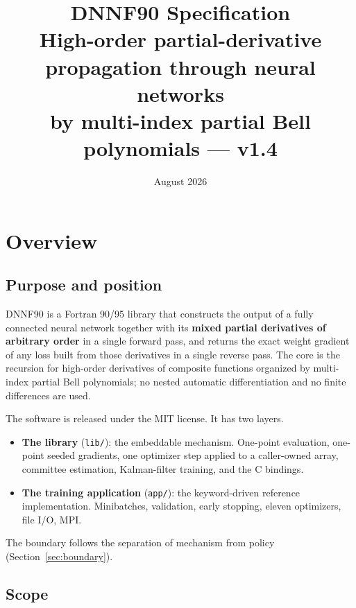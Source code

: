\documentclass[10pt,a4paper]{article}
\title{DNNF90 Specification\\[1mm]
{\large High-order partial-derivative propagation through neural networks\\
by multi-index partial Bell polynomials --- v1.4}}
\date{August 2026}
\author{}
\newcommand{\code}[1]{\texttt{#1}}
\begin{document}
\maketitle

\tableofcontents
\bigskip

\section{Overview}

\subsection{Purpose and position}

DNNF90 is a Fortran 90/95 library that constructs the output of a
fully connected neural network together with its \textbf{mixed partial
derivatives of arbitrary order} in a single forward pass, and returns
the exact weight gradient of any loss built from those derivatives in a
single reverse pass. The core is the recursion for high-order
derivatives of composite functions organized by multi-index partial
Bell polynomials; no nested automatic differentiation and no finite
differences are used.

The software is released under the MIT license. It has two layers.

\begin{itemize}[leftmargin=1.4em]
\item \textbf{The library} (\code{lib/}): the embeddable mechanism.
      One-point evaluation, one-point seeded gradients, one optimizer
      step applied to a caller-owned array, committee estimation,
      Kalman-filter training, and the C bindings.
\item \textbf{The training application} (\code{app/}): the
      keyword-driven reference implementation. Minibatches,
      validation, early stopping, eleven optimizers, file I/O, MPI.
\end{itemize}

The boundary follows the separation of mechanism from policy
(Section~\ref{sec:boundary}).

\subsection{Scope}
\end{document}
